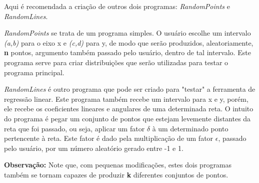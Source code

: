 \documentclass{article}
\begin{document}
Aqui é recomendada a criação de outros dois programas: \textit{RandomPoints} e \textit{RandomLines}. \par
\textit{RandomPoints} se trata de um programa simples. O usuário escolhe um intervalo \textit{(a,b)} para o eixo x e \textit{(c,d)} para y, de modo que serão produzidos, aleatoriamente, \textbf{n} pontos, argumento também passado pelo usuário, dentro de tal intervalo. Este programa serve para criar distribuições que serão utilizadas para testar o programa principal.\par
\textit{RandomLines} é outro programa que pode ser criado para "testar" a ferramenta de regressão linear. Este programa também recebe um intervalo para x e y, porém, ele recebe os coeficientes lineares e angulares de uma determinada reta. O intuito do programa é pegar um conjunto de pontos que estejam levemente distantes da reta que foi passado, ou seja, aplicar um fator \(\delta\) à um determinado ponto pertencente à reta. Este fator é dado pela multiplicação de um fator \(\epsilon\), passado pelo usuário, por um número aleatório gerado entre -1 e 1.\par

\textbf{Observação:} Note que, com pequenas modificações, estes dois programas também se tornam capazes de produzir \textbf{k} diferentes conjuntos de pontos.
\end{document}

